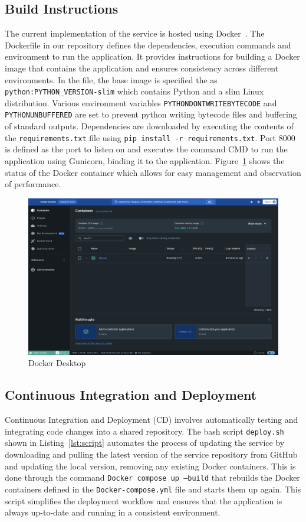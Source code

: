 \documentclass{surreydissertation}
\begin{document}
\subsection{Build Instructions}
The current implementation of the service is hosted using Docker~\cite{Docker}. The Dockerfile in our repository defines the dependencies, execution commands and environment to run the application. It provides instructions for building a Docker image that contains the application and ensures consistency across different environments. In the file, the base image is specified the as \texttt{python:PYTHON\_VERSION-slim} which contains Python and a slim Linux distribution. Various environment variables \texttt{PYTHONDONTWRITEBYTECODE} and \texttt{PYTHONUNBUFFERED} are set to prevent python writing bytecode files and buffering of standard outputs. Dependencies are downloaded by executing the contents of the \texttt{requirements.txt} file using \texttt{pip install -r requirements.txt}. Port 8000 is defined as the port to listen on and executes the command CMD to run the application using Gunicorn, binding it to the application. Figure~\ref{fig:Docker} shows the status of the Docker container which allows for easy management and observation of performance. 

\begin{figure}[H]
    \centering
    \includegraphics[width=1.0\linewidth]{Figures/Docker.png}
    \caption{Docker Desktop}
    \label{fig:Docker}
 \end{figure}


\subsection{Continuous Integration and Deployment}
Continuous Integration and Deployment (CD) involves automatically testing and integrating code changes into a shared repository. The bash script \texttt{deploy.sh} shown in  Listing~\ref{lst:script}  automates the process of updating the service by downloading and pulling the latest version of the service repository from GitHub and updating the local version, removing any existing Docker containers.  This is done through the command \texttt{Docker compose up --build} that rebuilds the Docker containers defined in the \texttt{Docker-compose.yml} file and starts them up again. This script simplifies the deployment workflow and ensures that the application is always up-to-date and running in a consistent environment.
\end{document}
